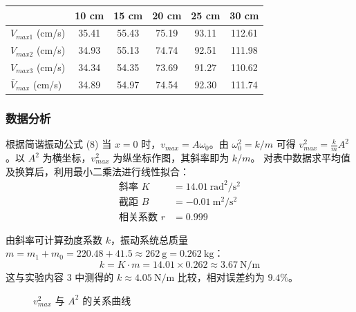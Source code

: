 \documentclass[11pt]{article}
\begin{document}
\begin{table}[h]
    \centering
    \begin{tabular}{lccccc}
        \toprule
        & 10 cm & 15 cm & 20 cm & 25 cm & 30 cm \\
        \midrule
        $V_{max1}$ (cm/s) & 35.41 & 55.43 & 75.19 & 93.11 & 112.61 \\
        $V_{max2}$ (cm/s) & 34.93 & 55.13 & 74.74 & 92.51 & 111.98 \\
        $V_{max3}$ (cm/s) & 34.34 & 54.35 & 73.69 & 91.27 & 110.62 \\
        \midrule
        $\bar{V}_{max}$ (cm/s) & 34.89 & 54.97 & 74.54 & 92.30 & 111.74 \\
        \bottomrule
    \end{tabular}
\end{table}

\subsubsection{数据分析}
根据简谐振动公式 (8) 当 $x=0$ 时，$v_{max} = A\omega_0$。由 $\omega_0^2 = k/m$ 可得 $v_{max}^2 = \frac{k}{m} A^2$。以 $A^2$ 为横坐标，$v_{max}^2$ 为纵坐标作图，其斜率即为 $k/m$。
对表中数据求平均值及换算后，利用最小二乘法进行线性拟合：
\begin{align*}
\text{斜率 } K &= 14.01\ \mathrm{rad^2/s^2} \\
\text{截距 } B &= -0.01\ \mathrm{m^2/s^2} \\
\text{相关系数 } r &= 0.999
\end{align*}

由斜率可计算劲度系数 $k$，振动系统总质量 $m = m_1 + m_0 = 220.48 + 41.5 \approx 262\ \mathrm{g} = 0.262\ \mathrm{kg}$：
\begin{equation}
k = K \cdot m = 14.01 \times 0.262 \approx 3.67\ \mathrm{N/m}
\end{equation}
这与实验内容 3 中测得的 $k \approx 4.05\ \mathrm{N/m}$ 比较，相对误差约为 $9.4\%$。

\begin{figure}[H]
    \centering
    \caption{$v_{max}^2$ 与 $A^2$ 的关系曲线}
    \label{fig:vmax-A2}
\end{figure}
\end{document}
